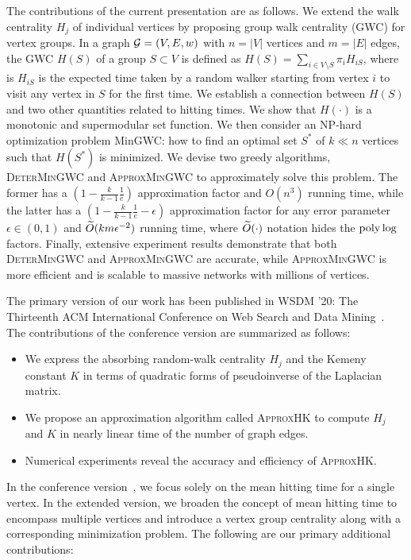 \documentclass[10pt,twocolumn,twoside]{IEEEtran}
\begin{document}
The contributions of the current presentation are as follows. We extend the walk centrality  $H_j$ of individual vertices by proposing group walk centrality (GWC) for vertex groups.   In a graph \(\mathcal{G}=(V,E,w)\) with $n=|V|$ vertices and $m=|E|$ edges,  the GWC $H(S)$ of a group $S \subset V$  is defined as  $H(S) =\sum_{i \in V \setminus S} \pi_i H_{iS}$, where is $H_{iS}$ is the expected time taken by a random walker starting from vertex $i$ to visit any vertex in \(S\) for the first time. We establish a connection between  $H(S)$ and two other quantities related to hitting times.  We show that $H(\cdot)$ is a monotonic and supermodular set function. We then consider an NP-hard optimization problem MinGWC: how to find an optimal set $S^*$ of $k \ll n$ vertices such that $H(S^*)$ is minimized.  We devise two greedy algorithms,  \textsc{DeterMinGWC} and \textsc{ApproxMinGWC} to approximately solve this problem. The former has a $(1-\frac{k}{k-1} \frac{1}{e})$  approximation factor and $O(n^3)$ running time, while the latter has a $(1-\frac{k}{k-1} \frac{1}{e}-\epsilon)$ approximation factor for any error parameter \(\epsilon\in(0,1)\) and $\widetilde{O} (km \epsilon^{-2})$ running time, where $\widetilde{O} (\cdot)$ notation hides the ${\rm poly}\log $ factors. Finally, extensive experiment results demonstrate that both \textsc{DeterMinGWC} and \textsc{ApproxMinGWC}  are accurate, while \textsc{ApproxMinGWC} is more efficient and is scalable to massive networks with millions of vertices.




\iffalse
    The primary version of our work has been published in WSDM '20: The Thirteenth ACM International Conference on Web Search and Data Mining~\cite{ZhXuZh20}. The contributions of the conference version are summarized as follows:

    \begin{itemize}
        \item We express the absorbing random-walk centrality \(H_j\) and the Kemeny constant \(K\) in terms of quadratic forms of pseudoinverse of the Laplacian matrix.
        \item We propose an approximation algorithm called \textsc{ApproxHK} to compute \(H_j\) and \(K\) in nearly linear time of the number of graph edges.
        \item Numerical experiments reveal the accuracy and efficiency of \textsc{ApproxHK}.
    \end{itemize}

    In the conference version~\cite{ZhXuZh20}, we focus solely on the mean hitting time for a single vertex.
    In the extended version, we broaden the concept of mean hitting time to encompass multiple vertices and introduce a vertex group centrality along with a corresponding minimization problem.
    The following are our primary additional contributions:
\end{document}
